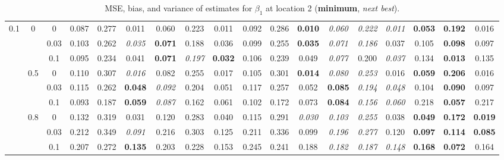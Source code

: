 \documentclass[authoryear, review, 10pt]{elsarticle}
\begin{document}
\begin{sidewaystable}[ht]
\begin{center}
\begin{tabular}{ccc|ccc|ccc|ccc|ccc|ccc}
\multirow{9}{*}{0.1} & \multirow{3}{*}{0} & 0 &   0.087 & 0.277 & 0.011 & 0.060 & 0.223 & 0.011 & 0.092 & 0.286 & \textbf{0.010} & \emph{0.060} & \emph{0.222} & \emph{0.011} & \textbf{0.053} & \textbf{0.192} & 0.016 \\ 
 &  & 0.03 &   0.103 & 0.262 & \emph{0.035} & \textbf{0.071} & 0.188 & 0.036 & 0.099 & 0.255 & \textbf{0.035} & \emph{0.071} & \emph{0.186} & 0.037 & 0.105 & \textbf{0.098} & 0.097 \\ 
 &  & 0.1 &   0.095 & 0.234 & 0.041 & \textbf{0.071} & \emph{0.197} & \textbf{0.032} & 0.106 & 0.239 & 0.049 & \emph{0.077} & 0.200 & \emph{0.037} & 0.134 & \textbf{0.013} & 0.135 \\ \cline{2-18}
 & \multirow{3}{*}{0.5} & 0 &   0.110 & 0.307 & \emph{0.016} & 0.082 & 0.255 & 0.017 & 0.105 & 0.301 & \textbf{0.014} & \emph{0.080} & \emph{0.253} & 0.016 & \textbf{0.059} & \textbf{0.206} & 0.016 \\ 
 &  & 0.03 &   0.115 & 0.262 & \textbf{0.048} & \emph{0.092} & 0.204 & 0.051 & 0.117 & 0.257 & 0.052 & \textbf{0.085} & \emph{0.194} & \emph{0.048} & 0.104 & \textbf{0.090} & 0.097 \\ 
 &  & 0.1 &   0.093 & 0.187 & \textbf{0.059} & \emph{0.087} & 0.162 & 0.061 & 0.102 & 0.172 & 0.073 & \textbf{0.084} & \emph{0.156} & \emph{0.060} & 0.218 & \textbf{0.057} & 0.217 \\ \cline{2-18}
 & \multirow{3}{*}{0.8} & 0 &   0.132 & 0.319 & 0.031 & 0.120 & 0.283 & 0.040 & 0.115 & 0.291 & \emph{0.030} & \emph{0.103} & \emph{0.255} & 0.038 & \textbf{0.049} & \textbf{0.172} & \textbf{0.019} \\ 
 &  & 0.03 &   0.212 & 0.349 & \emph{0.091} & 0.216 & 0.303 & 0.125 & 0.211 & 0.336 & 0.099 & \emph{0.196} & \emph{0.277} & 0.120 & \textbf{0.097} & \textbf{0.114} & \textbf{0.085} \\ 
 &  & 0.1 &   0.207 & 0.272 & \textbf{0.135} & 0.203 & 0.228 & 0.153 & 0.245 & 0.241 & 0.188 & \emph{0.182} & \emph{0.187} & \emph{0.148} & \textbf{0.168} & \textbf{0.072} & 0.164 \\ 
  \end{tabular}
\caption{MSE, bias, and variance of estimates for $\beta_1$ at location 2 (\textbf{minimum}, \emph{next best}).}
\end{center}
\end{sidewaystable}
\end{document}
